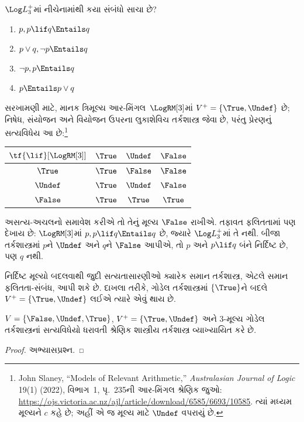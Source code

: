 \begin{prob}
  $\Log L_3^{+}$માં નીચેનામાંથી કયા સંબંધો સાચા છે?
  \begin{enumerate}
    \item $p, p \lif q \Entails q$
    \item $p \lor q, \lnot p \Entails q$
    \item $\lnot p, p \Entails q$
    \item $p \Entails p \lor q$
  \end{enumerate}
\end{prob}

સરખામણી માટે, માનક ત્રિમૂલ્ય આર-મિંગલ~$\LogRM[3]$માં
$V^+=\{\True,\Undef\}$ છે; નિષેધ, સંયોજન અને વિયોજન
ઉપરના લુકાશેવિચ તર્કશાસ્ત્ર જેવા છે, પરંતુ પ્રેરણનું
સત્યવિધેય આ છે:\footnote{John Slaney, “Models of Relevant
Arithmetic,” \emph{Australasian Journal of Logic} 19(1)
(2022), વિભાગ~1, પૃ.~235ની આર-મિંગલ શ્રેણિક જુઓ:
\url{https://ojs.victoria.ac.nz/ajl/article/download/6585/6693/10585}.
ત્યાં મધ્યમ મૂલ્યને $c$ કહે છે; અહીં એ જ મૂલ્ય માટે
$\Undef$ વપરાયું છે.}
\begin{center}
  \begin{tabular}{c|ccc}
    $\tf{\lif}[\LogRM[3]]$ & $\True$ & $\Undef$ & $\False$\\
    \hline
    $\True$ & $\True$ & $\False$ & $\False$\\
    $\Undef$ & $\True$ & $\Undef$ & $\False$\\
    $\False$ & $\True$ & $\True$ & $\True$
  \end{tabular}
\end{center}
અસત્ય-અચલનો સમાવેશ કરીએ તો તેનું મૂલ્ય $\False$ રાખીએ.
તફાવત ફલિતતામાં પણ દેખાય છે: $\LogRM[3]$માં
$p,p\lif q\Entails q$ છે, જ્યારે $\Log L_3^{+}$માં તે નથી.
બીજા તર્કશાસ્ત્રમાં $p$ને $\Undef$ અને $q$ને $\False$ આપીએ,
તો $p$ અને $p\lif q$ બંને નિર્દિષ્ટ છે, પણ $q$ નથી.

નિર્દિષ્ટ મૂલ્યો બદલવાથી જુદી સત્યતાસારણીઓ ક્યારેક સમાન
તર્કશાસ્ત્ર, એટલે સમાન ફલિતતા-સંબંધ, આપી શકે છે. દાખલા તરીકે,
ગોડેલ તર્કશાસ્ત્રમાં $\{\True\}$ને બદલે
$V^+ = \{\True, \Undef\}$ લઈએ ત્યારે એવું થાય છે.

\begin{prop}
  $V = \{\False, \Undef,\True\}$, $V^+=\{\True,
  \Undef\}$ અને $3$-મૂલ્ય ગોડેલ તર્કશાસ્ત્રનાં સત્યવિધેયો ધરાવતી
  શ્રેણિક શાસ્ત્રીય તર્કશાસ્ત્ર વ્યાખ્યાયિત કરે છે.
\end{prop}

\begin{proof}
  અભ્યાસપ્રશ્ન.
\end{proof}

